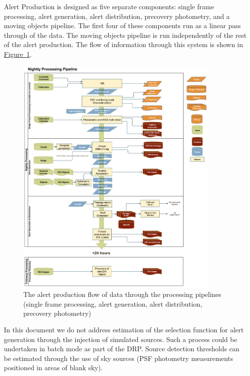 Alert Production is designed as five separate components: single frame processing, alert generation, alert distribution, precovery photometry, and a moving objects pipeline. The first four of these components run as a linear pass through of the data. The moving objects pipeline is run independently of the rest of the alert production. The flow of information through this system is shown in \hyperref[fig:nightly]{Figure~\ref{fig:nightly}}.

\begin{figure}
\begin{center}
\includegraphics[width=0.9\textwidth]{figures/LDM-151_Nightly_Overview.png}
\caption{\label{fig:nightly} The alert production flow of data through the processing pipelines (single frame processing, alert generation,  alert distribution, precovery photometry) }
\end{center}
\end{figure}

In this document we do not address estimation of the selection function for alert generation through the injection of simulated sources. Such a process could be undertaken in batch mode as part of the DRP. Source detection thresholds can be estimated through the use of sky sources (PSF photometry measurements positioned in areas of blank sky).

